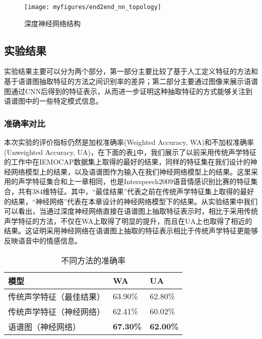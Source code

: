\begin{figure}[htb] %
    \centering
    \texttt{[image: myfigures/end2end\_nn\_topology]}
    \caption{深度神经网络结构}
    \label{fig:end2end_nn_topology}
\end{figure}

\subsection{实验结果}
\label{ssec:end2end_experiment_result}

实验结果主要可以分为两个部分，第一部分主要比较了基于人工定义特征的方法和基于语谱图抽取特征的方法之间识别率的差异；第二部分主要通过图像来展示语谱图通过CNN后得到的特征表示，从而进一步证明这种抽取特征的方式能够关注到语谱图中的一些特定模式信息。

\subsubsection{准确率对比}
\label{sssec:end2end_acc_comp}

本次实验的评价指标仍然是加权准确率(Weighted Accuracy, WA)和不加权准确率(Unweighted Accuracy, UA)，在下面的表\ref{tab:acc_end2end}中，我们展示了以前采用传统声学特征的工作中在IEMOCAP数据集上取得的最好的结果，同样的特征集在我们设计的神经网络模型上的结果，以及语谱图作为输入在我们神经网络模型上的结果。这里采用的声学特征集合和上一章相同，也是Interspeech2009语音情感识别比赛的特征集合，共有384维特征。其中，“最佳结果”代表之前在传统声学特征集上取得的最好的结果，“神经网络”代表在本章设计的神经网络模型下的结果。从实验结果中我们可以看出，当通过深度神经网络直接在语谱图上抽取特征表示时，相比于采用传统声学特征的方法，不仅在WA上取得了明显的提升，而且在UA上也取得了相近的结果。这证明采用神经网络在语谱图上抽取的特征表示相比于传统声学特征更能够反映语音中的情感信息。

\begin{table}[htb]
\centering
\begin{minipage}[t]{0.8\linewidth} %
\caption{不同方法的准确率}
\label{tab:acc_end2end}
    \begin{tabularx}{\linewidth}{X<{\centering} X<{\centering} X<{\centering}}
        \toprule[1.5pt]
        模型 & WA & UA \\
        \midrule[1pt]
        传统声学特征（最佳结果） & 63.90\% & 62.80\% \\
        传统声学特征（神经网络） & 62.41\% & 60.02\% \\
        语谱图（神经网络） & \textbf{67.30\%} & \textbf{62.00\%} \\
        \bottomrule[1.5pt]
    \end{tabularx}
\end{minipage}
\end{table}

